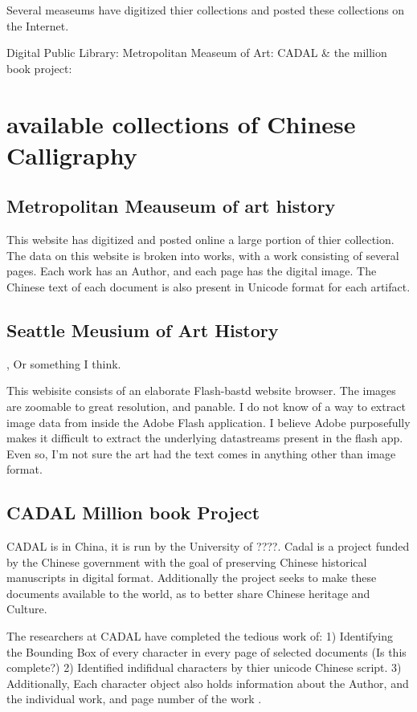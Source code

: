 Several measeums have digitized thier collections and posted these collections on the Internet.

Digital Public Library:
Metropolitan Measeum of Art:
CADAL \& the million book project:

\section{available collections of Chinese Calligraphy}

\subsection{Metropolitan Meauseum of art history}

This website has digitized and posted online a large portion of thier collection.  The data on this website is broken into works, with a work consisting of several pages.  Each work has an Author, and each page has the digital image.  The Chinese text of each document is also present in Unicode format for each artifact.

\subsection{Seattle Meusium of Art History}, Or something I think.

This webisite consists of an elaborate Flash-bastd website browser.  The images are zoomable to great resolution, and panable.  I do not know of a way to extract image data from inside the Adobe Flash application.  I believe Adobe purposefully makes it difficult to extract the underlying datastreams present in the flash app.
Even so, I'm not sure the art had the text comes in anything other than image format.

\subsection{CADAL Million book Project}

CADAL is in China, it is run by the University of ????.  Cadal is a project funded by the Chinese government with the goal of preserving Chinese historical manuscripts in digital format.  Additionally the project seeks to make these documents available to the world, as to better share Chinese heritage and Culture.

The researchers at CADAL have completed the tedious work of:
1) Identifying the Bounding Box of every character in every page of selected documents (Is this complete?)
2) Identified indifidual characters by thier unicode Chinese script.
3) Additionally, Each character object also holds information about the Author, and the individual work, and page number of the work .








